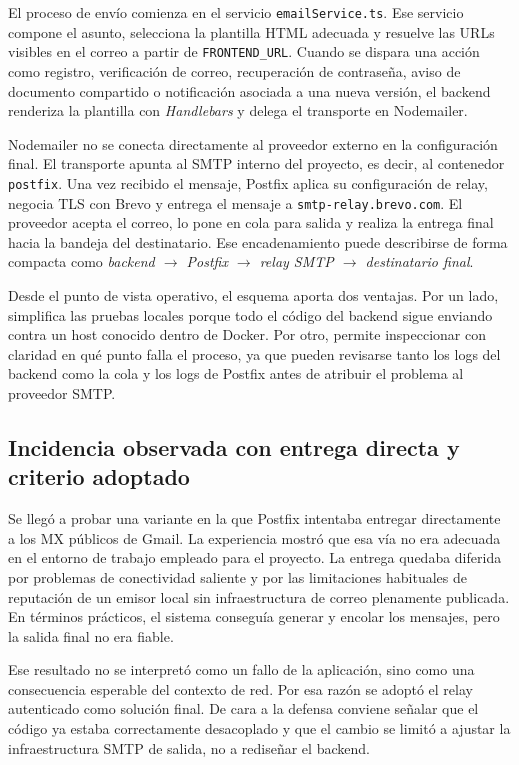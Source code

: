 \documentclass[11pt, a4paper]{article}
\begin{document}
El proceso de envío comienza en el servicio \texttt{emailService.ts}. Ese servicio compone el asunto, selecciona la plantilla HTML adecuada y resuelve las URLs visibles en el correo a partir de \texttt{FRONTEND\_URL}. Cuando se dispara una acción como registro, verificación de correo, recuperación de contraseña, aviso de documento compartido o notificación asociada a una nueva versión, el backend renderiza la plantilla con \textit{Handlebars} y delega el transporte en Nodemailer.

Nodemailer no se conecta directamente al proveedor externo en la configuración final. El transporte apunta al SMTP interno del proyecto, es decir, al contenedor \texttt{postfix}. Una vez recibido el mensaje, Postfix aplica su configuración de relay, negocia TLS con Brevo y entrega el mensaje a \texttt{smtp-relay.brevo.com}. El proveedor acepta el correo, lo pone en cola para salida y realiza la entrega final hacia la bandeja del destinatario. Ese encadenamiento puede describirse de forma compacta como \textit{backend $\rightarrow$ Postfix $\rightarrow$ relay SMTP $\rightarrow$ destinatario final}.

Desde el punto de vista operativo, el esquema aporta dos ventajas. Por un lado, simplifica las pruebas locales porque todo el código del backend sigue enviando contra un host conocido dentro de Docker. Por otro, permite inspeccionar con claridad en qué punto falla el proceso, ya que pueden revisarse tanto los logs del backend como la cola y los logs de Postfix antes de atribuir el problema al proveedor SMTP.

\subsection{Incidencia observada con entrega directa y criterio adoptado}

Se llegó a probar una variante en la que Postfix intentaba entregar directamente a los MX públicos de Gmail. La experiencia mostró que esa vía no era adecuada en el entorno de trabajo empleado para el proyecto. La entrega quedaba diferida por problemas de conectividad saliente y por las limitaciones habituales de reputación de un emisor local sin infraestructura de correo plenamente publicada. En términos prácticos, el sistema conseguía generar y encolar los mensajes, pero la salida final no era fiable.

Ese resultado no se interpretó como un fallo de la aplicación, sino como una consecuencia esperable del contexto de red. Por esa razón se adoptó el relay autenticado como solución final. De cara a la defensa conviene señalar que el código ya estaba correctamente desacoplado y que el cambio se limitó a ajustar la infraestructura SMTP de salida, no a rediseñar el backend.
\end{document}
